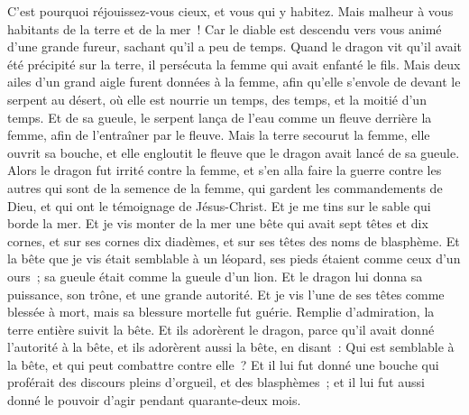 \begin{multicols}{2}
C'est pourquoi réjouissez-vous cieux, et vous qui y habitez. Mais malheur à vous habitants de la terre et de la mer~! Car le diable est descendu vers vous animé d'une grande fureur, sachant qu'il a peu de temps.
Quand le dragon vit qu'il avait été précipité sur la terre, il persécuta la femme qui avait enfanté le fils.
Mais deux ailes d'un grand aigle furent données à la femme, afin qu'elle s'envole de devant le serpent au désert, où elle est nourrie un temps, des temps, et la moitié d'un temps.
Et de sa gueule, le serpent lança de l'eau comme un fleuve derrière la femme, afin de l'entraîner par le fleuve.
Mais la terre secourut la femme, elle ouvrit sa bouche, et elle engloutit le fleuve que le dragon avait lancé de sa gueule.
Alors le dragon fut irrité contre la femme, et s'en alla faire la guerre contre les autres qui sont de la semence de la femme, qui gardent les commandements de Dieu, et qui ont le témoignage de Jésus-Christ.
Et je me tins sur le sable qui borde la mer.
\VerseOne{}Et je vis monter de la mer une bête qui avait sept têtes et dix cornes, et sur ses cornes dix diadèmes, et sur ses têtes des noms de blasphème.
Et la bête que je vis était semblable à un léopard, ses pieds étaient comme ceux d'un ours~; sa gueule était comme la gueule d'un lion. Et le dragon lui donna sa puissance, son trône, et une grande autorité.
Et je vis l'une de ses têtes comme blessée à mort, mais sa blessure mortelle fut guérie. Remplie d'admiration, la terre entière suivit la bête.
Et ils adorèrent le dragon, parce qu'il avait donné l'autorité à la bête, et ils adorèrent aussi la bête, en disant~: Qui est semblable à la bête, et qui peut combattre contre elle~?
Et il lui fut donné une bouche qui proférait des discours pleins d'orgueil, et des blasphèmes~; et il lui fut aussi donné le pouvoir d'agir pendant quarante-deux mois.

\end{multicols}
